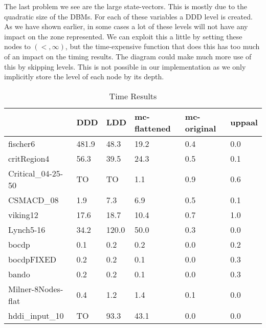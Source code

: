 The last problem we see are the large state-vectors. This is mostly due to the quadratic size of the DBMs. For each of these variables a DDD level is created. As we have shown earlier, in some cases a lot of these levels will not have any impact on the zone represented. We can exploit this a little by setting these nodes to $(<,\infty)$, but the time-expensive function that does this has too much of an impact on the timing results. The diagram could make much more use of this by skipping levels. This is not possible in our implementation as we only implicitly store the level of each node by its depth. 

\begin{table}

    \begin{tabular}{|l|l|l|l|l|l|}
    \hline
                       & DDD   & LDD   & mc-flattened & mc-original & uppaal \\ \hline
    fischer6           & 481.9 & 48.3  & 19.2         & 0.4         & 0.0    \\
    critRegion4        & 56.3  & 39.5  & 24.3         & 0.5         & 0.1    \\
    Critical\_04-25-50 & TO    & TO    & 1.1          & 0.9         & 0.6    \\
    CSMACD\_08         & 1.9   & 7.3   & 6.9          & 0.5         & 0.1    \\
    viking12           & 17.6  & 18.7  & 10.4         & 0.7         & 1.0    \\
    Lynch5-16          & 34.2  & 120.0 & 50.0         & 0.3         & 0.0    \\
    bocdp              & 0.1   & 0.2   & 0.2          & 0.0         & 0.2    \\
    bocdpFIXED         & 0.2   & 0.2   & 0.1          & 0.0         & 0.3    \\
    bando              & 0.2   & 0.2   & 0.1          & 0.0         & 0.3    \\
    Milner-8Nodes-flat & 0.4   & 1.2   & 1.4          & 0.1         & 0.0    \\
    hddi\_input\_10    & TO    & 93.3  & 43.1         & 0.0         & 0.0    \\ \hline
    \end{tabular}
\caption{Time Results}
\label{tab:time_results}
\end{table}

